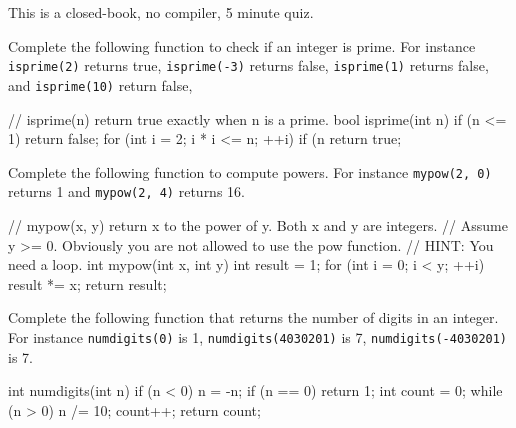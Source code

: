 

This is a closed-book, no compiler, 5 minute quiz.

\nextq
Complete the following function to check if an integer is prime.
For instance \verb!isprime(2)! returns true,
\verb!isprime(-3)! returns false,
\verb!isprime(1)! returns false,
and
\verb!isprime(10)! return false,
\\
\ANSWER
\begin{answercode}
// isprime(n) return true exactly when n is a prime.
bool isprime(int n)
{
    if (n <= 1) return false;
    for (int i = 2; i * i <= n; ++i)
    {
        if (n %
    }
    return true;
}

\end{answercode}

\nextq
Complete the following function to compute powers.
For instance \verb!mypow(2, 0)! returns 1 and
\verb!mypow(2, 4)! returns 16.
\\
\ANSWER
\begin{answercode}
// mypow(x, y) return x to the power of y. Both x and y are integers.
// Assume y >= 0. Obviously you are not allowed to use the pow function.
// HINT: You need a loop.
int mypow(int x, int y)
{
    int result = 1;
    for (int i = 0; i < y; ++i)
    {
        result *= x;
    }
    return result;
}
\end{answercode}

\nextq
Complete the following function that returns the number of digits in an integer.
For instance
\verb!numdigits(0)! is 1,
\verb!numdigits(4030201)! is 7,
\verb!numdigits(-4030201)! is 7.
\\
\ANSWER
\begin{answercode}
int numdigits(int n)
{
    if (n < 0) n = -n;
    if (n == 0) return 1;
    int count = 0;
    while (n > 0)
    {
        n /= 10;
        count++;
    }
    return count;
}
\end{answercode}


